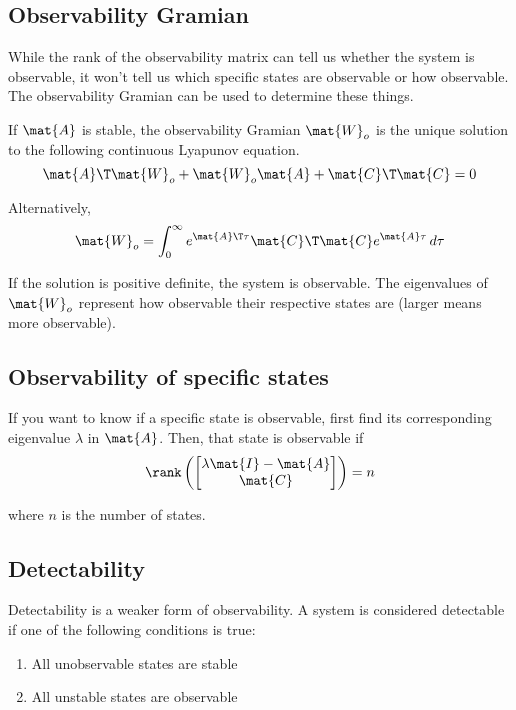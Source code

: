 \subsection{Observability Gramian}

While the rank of the observability matrix can tell us whether the system is
observable, it won't tell us which specific states are observable or how
observable. The observability Gramian can be used to determine these things.

If $\mat{A}$ is stable, the observability Gramian $\mat{W}_o$ is the unique
solution to the following continuous Lyapunov equation.
\begin{equation}
  \mat{A}\T\mat{W}_o + \mat{W}_o\mat{A} + \mat{C}\T\mat{C} = 0
\end{equation}

Alternatively,
\begin{equation}
  \mat{W}_o =
    \int_0^\infty e^{\mat{A}\T\tau} \mat{C}\T\mat{C} e^{\mat{A}\tau} \,d\tau
\end{equation}

If the solution is positive definite, the system is observable. The eigenvalues
of $\mat{W}_o$ represent how observable their respective states are (larger
means more observable).

\subsection{Observability of specific states}

If you want to know if a specific state is observable, first find its
corresponding eigenvalue $\lambda$ in $\mat{A}$. Then, that state is
observable if
\begin{equation}
  \rank\left(
  \begin{bmatrix}
    \lambda\mat{I} - \mat{A} \\
    \mat{C}
  \end{bmatrix}\right) = n
\end{equation}

where $n$ is the number of \glspl{state}.

\subsection{Detectability}
\label{subsec:detectability}

Detectability is a weaker form of observability. A system is considered
detectable if one of the following conditions is true:
\begin{enumerate}
  \item All unobservable states are stable
  \item All unstable states are observable
\end{enumerate}
